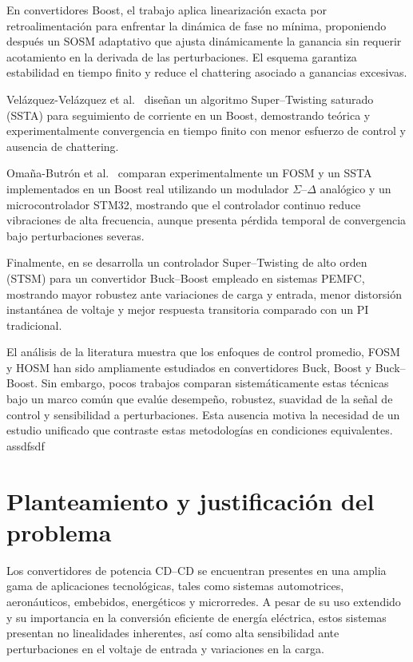 \documentclass[12pt,oneside,openany]{book}
\begin{document}
En convertidores Boost, el trabajo \cite{ea_17} aplica linearización exacta por retroalimentación para enfrentar la dinámica de fase no mínima, proponiendo después un SOSM adaptativo que ajusta dinámicamente la ganancia sin requerir acotamiento en la derivada de las perturbaciones. El esquema garantiza estabilidad en tiempo finito y reduce el chattering asociado a ganancias excesivas.

Velázquez-Velázquez et al.~\cite{ea_18} diseñan un algoritmo Super–Twisting saturado (SSTA) para seguimiento de corriente en un Boost, demostrando teórica y experimentalmente convergencia en tiempo finito con menor esfuerzo de control y ausencia de chattering.

Omaña-Butrón et al.~\cite{ea_omana} comparan experimentalmente un FOSM y un SSTA implementados en un Boost real utilizando un modulador $\Sigma$–$\Delta$ analógico y un microcontrolador STM32, mostrando que el controlador continuo reduce vibraciones de alta frecuencia, aunque presenta pérdida temporal de convergencia bajo perturbaciones severas.

Finalmente, en \cite{ea_20} se desarrolla un controlador Super–Twisting de alto orden (STSM) para un convertidor Buck–Boost empleado en sistemas PEMFC, mostrando mayor robustez ante variaciones de carga y entrada, menor distorsión instantánea de voltaje y mejor respuesta transitoria comparado con un PI tradicional.

\bigskip

El análisis de la literatura muestra que los enfoques de control promedio, FOSM y HOSM han sido ampliamente estudiados en convertidores Buck, Boost y Buck–Boost. Sin embargo, pocos trabajos comparan sistemáticamente estas técnicas bajo un marco común que evalúe desempeño, robustez, suavidad de la señal de control y sensibilidad a perturbaciones. Esta ausencia motiva la necesidad de un estudio unificado que contraste estas metodologías en condiciones equivalentes.
assdfsdf


\section{Planteamiento y justificaci\'on del problema}



Los convertidores de potencia CD–CD se encuentran presentes en una amplia gama de aplicaciones tecnológicas, tales como sistemas automotrices, aeronáuticos, embebidos, energéticos y microrredes. A pesar de su uso extendido y su importancia en la conversión eficiente de energía eléctrica, estos sistemas presentan no linealidades inherentes, así como alta sensibilidad ante perturbaciones en el voltaje de entrada y variaciones en la carga.
\end{document}
